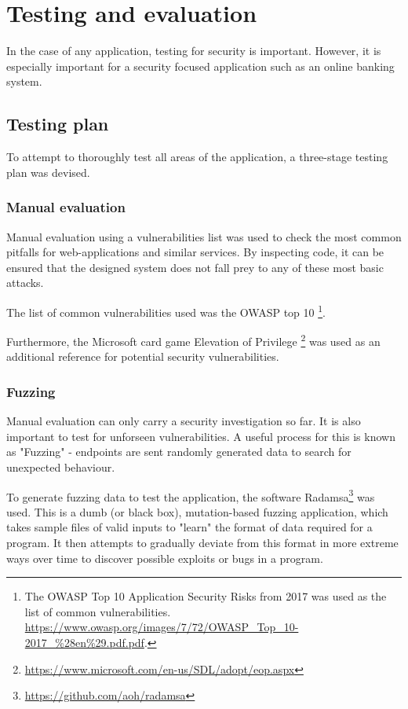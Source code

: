 \section{Testing and evaluation}

In the case of any application, testing for security is important. However, it is especially important for a security focused application such as an online banking system. 

\subsection{Testing plan}

To attempt to thoroughly test all areas of the application, a three-stage testing plan was devised. 

\subsubsection{Manual evaluation}\label{manualEvaluation}

Manual evaluation using a vulnerabilities list was used to check the most common pitfalls for web-applications and similar services. By inspecting code, it can be ensured that the designed system does not fall prey to any of these most basic attacks.

The list of common vulnerabilities used was the OWASP top 10 \footnote{ \nocite{owaspTop10}
    The OWASP Top 10 Application Security Risks from 2017 was used as the list of common vulnerabilities. \url{https://www.owasp.org/images/7/72/OWASP_Top_10-2017_\%28en\%29.pdf.pdf}.
}.

Furthermore, the Microsoft card game Elevation of Privilege \footnote{
    \url{https://www.microsoft.com/en-us/SDL/adopt/eop.aspx} \nocite{microsoftCardGame}
} was used as an additional reference for potential security vulnerabilities.

\subsubsection{Fuzzing}\label{fuzzing}

Manual evaluation can only carry a security investigation so far. It is also important to test for unforseen vulnerabilities. A useful process for this is known as "Fuzzing" - endpoints are sent randomly generated data to search for unexpected behaviour.

To generate fuzzing data to test the application, the software Radamsa\footnote{
    \url{https://github.com/aoh/radamsa}
} was used. This is a dumb (or black box), mutation-based fuzzing application, which takes sample files of valid inputs to "learn" the format of data required for a program. It then attempts to gradually deviate from this format in more extreme ways over time to discover possible exploits or bugs in a program. \cite{mwrFuzzing}

